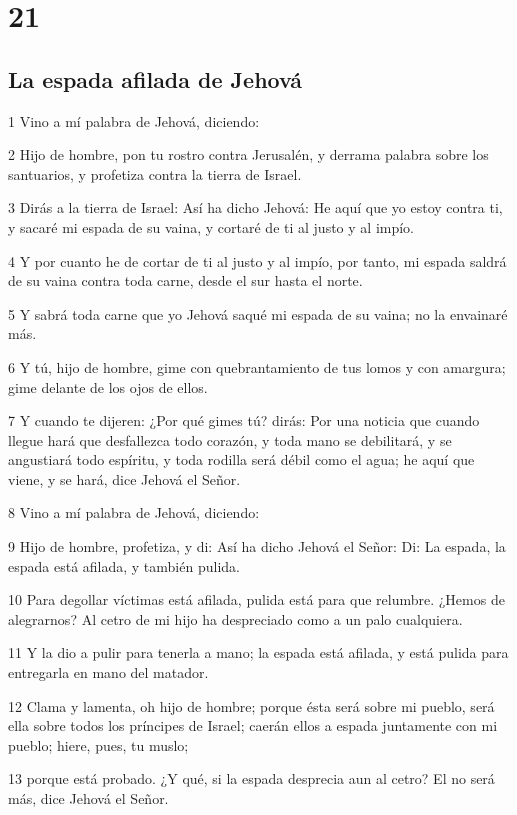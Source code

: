 \chapter{21}

\section*{La espada afilada de Jehová}

\par 1 Vino a mí palabra de Jehová, diciendo:
\par 2 Hijo de hombre, pon tu rostro contra Jerusalén, y derrama palabra sobre los santuarios, y profetiza contra la tierra de Israel.
\par 3 Dirás a la tierra de Israel: Así ha dicho Jehová: He aquí que yo estoy contra ti, y sacaré mi espada de su vaina, y cortaré de ti al justo y al impío.
\par 4 Y por cuanto he de cortar de ti al justo y al impío, por tanto, mi espada saldrá de su vaina contra toda carne, desde el sur hasta el norte.
\par 5 Y sabrá toda carne que yo Jehová saqué mi espada de su vaina; no la envainaré más.
\par 6 Y tú, hijo de hombre, gime con quebrantamiento de tus lomos y con amargura; gime delante de los ojos de ellos.
\par 7 Y cuando te dijeren: ¿Por qué gimes tú? dirás: Por una noticia que cuando llegue hará que desfallezca todo corazón, y toda mano se debilitará, y se angustiará todo espíritu, y toda rodilla será débil como el agua; he aquí que viene, y se hará, dice Jehová el Señor.
\par 8 Vino a mí palabra de Jehová, diciendo:
\par 9 Hijo de hombre, profetiza, y di: Así ha dicho Jehová el Señor: Di: La espada, la espada está afilada, y también pulida.
\par 10 Para degollar víctimas está afilada, pulida está para que relumbre. ¿Hemos de alegrarnos? Al cetro de mi hijo ha despreciado como a un palo cualquiera.
\par 11 Y la dio a pulir para tenerla a mano; la espada está afilada, y está pulida para entregarla en mano del matador.
\par 12 Clama y lamenta, oh hijo de hombre; porque ésta será sobre mi pueblo, será ella sobre todos los príncipes de Israel; caerán ellos a espada juntamente con mi pueblo; hiere, pues, tu muslo;
\par 13 porque está probado. ¿Y qué, si la espada desprecia aun al cetro? El no será más, dice Jehová el Señor.
